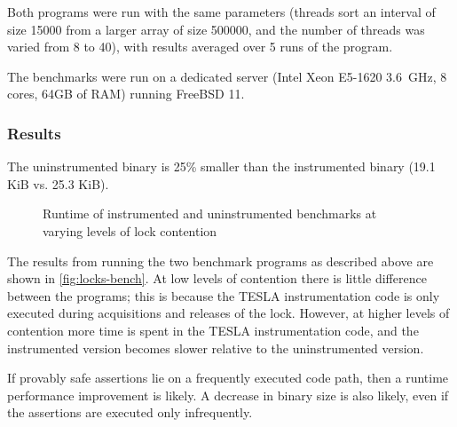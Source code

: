 Both programs were run with the same parameters (threads sort an
interval of size \num{15000} from a larger array of size \num{500000},
and the number of threads was varied from 8 to 40), with results
averaged over 5 runs of the program.

The benchmarks were run on a dedicated server (Intel Xeon E5-1620
\SI{3.6}{\GHz}, 8 cores, 64GB of RAM) running FreeBSD 11.

\subsubsection{Results}

The uninstrumented binary is 25\% smaller than the instrumented binary
(\num{19.1} KiB vs. \num{25.3} KiB).

\begin{figure}
  \centering
  \caption{Runtime of instrumented and uninstrumented benchmarks at
  varying levels of lock contention}
  \label{fig:locks-bench}
\end{figure}

The results from running the two benchmark programs as described above
are shown in \autoref{fig:locks-bench}. At low levels of contention
there is little difference between the programs; this is because the
TESLA instrumentation code is only executed during acquisitions and
releases of the lock. However, at higher levels of contention more time
is spent in the TESLA instrumentation code, and the instrumented version
becomes slower relative to the uninstrumented version.

If provably safe assertions lie on a frequently executed code path, then
a runtime performance improvement is likely. A decrease in binary size
is also likely, even if the assertions are executed only infrequently.

